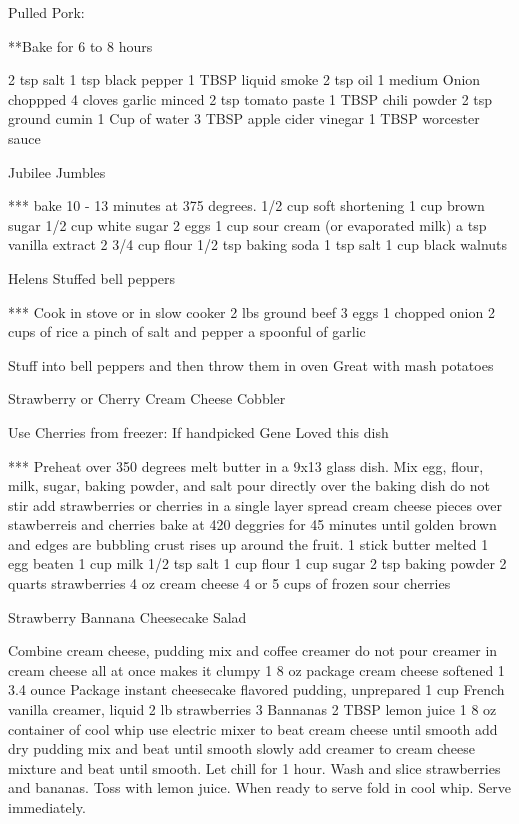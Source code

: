 Pulled Pork: 

**Bake for 6 to 8 hours

2 tsp salt 
1 tsp black pepper
1 TBSP liquid smoke
2 tsp oil 
1 medium Onion choppped
4 cloves garlic minced
2 tsp tomato paste 
1 TBSP chili powder
2 tsp ground cumin
1 Cup of water
3 TBSP apple cider vinegar
1 TBSP worcester sauce

Jubilee Jumbles 

*** bake 10 - 13 minutes at 375 degrees.  
1/2 cup soft shortening 
1 cup brown sugar 
1/2 cup white sugar
2 eggs
1 cup sour cream (or evaporated milk)
a tsp vanilla extract
2 3/4 cup flour 
1/2 tsp baking soda
1 tsp salt 
1 cup black walnuts 

Helens Stuffed bell peppers 

*** Cook in stove or in slow cooker
2 lbs ground beef 
3 eggs 
1 chopped onion 
2 cups of rice 
a pinch of salt and pepper 
a spoonful of garlic 
 

Stuff into bell peppers and then throw them in oven 
Great with mash potatoes

Strawberry or Cherry Cream Cheese Cobbler

Use Cherries from freezer: If handpicked 
Gene Loved this dish


*** Preheat over 350 degrees melt butter in a 9x13 glass dish. 
Mix egg, flour, milk, sugar, baking powder, and salt pour directly over the baking dish do not stir
add strawberries or cherries in a single layer spread cream cheese pieces over stawberreis and cherries 
bake at 420 deggries for 45 minutes until golden brown and edges are bubbling crust rises up around the fruit.  
1 stick butter melted
1 egg beaten 
1 cup milk 
1/2 tsp salt 
1 cup flour 
1 cup sugar 
2 tsp baking powder
2 quarts strawberries 
4 oz cream cheese
4 or 5 cups of frozen sour cherries 


Strawberry Bannana Cheesecake Salad 

Combine cream cheese, pudding mix and coffee creamer do not pour creamer in cream cheese all at once makes it 
clumpy 
1 8 oz package cream cheese softened 
1 3.4 ounce Package instant cheesecake flavored pudding, unprepared
1 cup French vanilla creamer, liquid
2 lb strawberries
3 Bannanas
2 TBSP lemon juice
1 8 oz container of cool whip
use electric mixer to beat cream cheese until smooth add dry pudding mix and beat until smooth slowly add creamer to cream cheese mixture and beat until smooth.  
Let chill for 1 hour.  Wash and slice strawberries and bananas.  Toss with lemon juice.  When ready to serve fold in cool whip.  Serve immediately.

